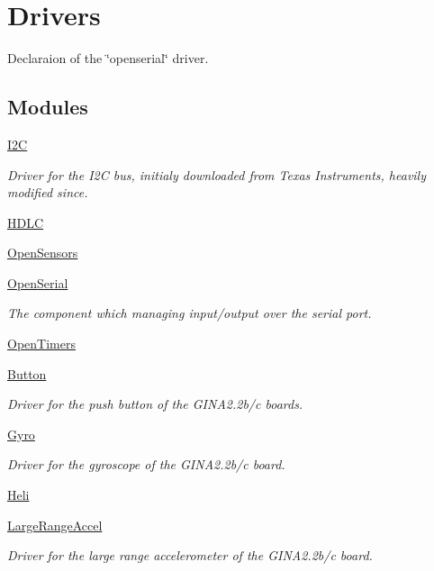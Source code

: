 \hypertarget{group__drivers}{}\section{Drivers}
\label{group__drivers}


Declaraion of the \char`\"{}openserial\char`\"{} driver.  


\subsection*{Modules}
\begin{DoxyCompactItemize}
\item 
\hyperlink{group___i2_c}{I2C}
\begin{DoxyCompactList}\small\item\em Driver for the I2C bus, initialy downloaded from Texas Instruments, heavily modified since. \end{DoxyCompactList}\item 
\hyperlink{group___h_d_l_c}{H\+D\+LC}
\item 
\hyperlink{group___open_sensors}{Open\+Sensors}
\item 
\hyperlink{group___open_serial}{Open\+Serial}
\begin{DoxyCompactList}\small\item\em The component which managing input/output over the serial port. \end{DoxyCompactList}\item 
\hyperlink{group___open_timers}{Open\+Timers}
\item 
\hyperlink{group___button}{Button}
\begin{DoxyCompactList}\small\item\em Driver for the push button of the G\+I\+N\+A2.\+2b/c boards. \end{DoxyCompactList}\item 
\hyperlink{group___gyro}{Gyro}
\begin{DoxyCompactList}\small\item\em Driver for the gyroscope of the G\+I\+N\+A2.\+2b/c board. \end{DoxyCompactList}\item 
\hyperlink{group___heli}{Heli}
\item 
\hyperlink{group___large_range_accel}{Large\+Range\+Accel}
\begin{DoxyCompactList}\small\item\em Driver for the large range accelerometer of the G\+I\+N\+A2.\+2b/c board. \end{DoxyCompactList}\item 

\end{DoxyCompactItemize}
